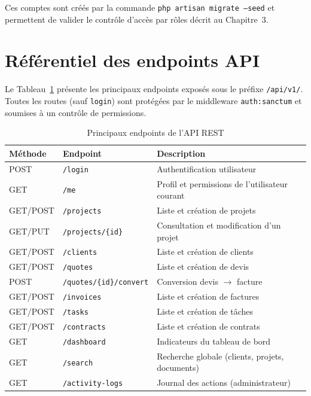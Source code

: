 \medskip

Ces comptes sont créés par la commande \texttt{php artisan migrate --seed} et
permettent de valider le contrôle d'accès par rôles décrit au Chapitre~3.

\section{Référentiel des endpoints API}

Le Tableau~\ref{tab:api_endpoints} présente les principaux endpoints exposés
sous le préfixe \texttt{/api/v1/}. Toutes les routes (sauf \texttt{login}) sont
protégées par le middleware \texttt{auth:sanctum} et soumises à un contrôle de
permissions.

\begin{table}[H]
\caption{Principaux endpoints de l'API REST}
\label{tab:api_endpoints}
\centering
\footnotesize
\begin{tabular}{|l|l|p{5.5cm}|}
\hline
\textbf{Méthode} & \textbf{Endpoint} & \textbf{Description} \\
\hline
POST & \texttt{/login} & Authentification utilisateur \\
\hline
GET & \texttt{/me} & Profil et permissions de l'utilisateur courant \\
\hline
GET/POST & \texttt{/projects} & Liste et création de projets \\
\hline
GET/PUT & \texttt{/projects/\{id\}} & Consultation et modification d'un projet \\
\hline
GET/POST & \texttt{/clients} & Liste et création de clients \\
\hline
GET/POST & \texttt{/quotes} & Liste et création de devis \\
\hline
POST & \texttt{/quotes/\{id\}/convert} & Conversion devis $\rightarrow$ facture \\
\hline
GET/POST & \texttt{/invoices} & Liste et création de factures \\
\hline
GET/POST & \texttt{/tasks} & Liste et création de tâches \\
\hline
GET/POST & \texttt{/contracts} & Liste et création de contrats \\
\hline
GET & \texttt{/dashboard} & Indicateurs du tableau de bord \\
\hline
GET & \texttt{/search} & Recherche globale (clients, projets, documents) \\
\hline
GET & \texttt{/activity-logs} & Journal des actions (administrateur) \\
\hline
\end{tabular}
\end{table}

